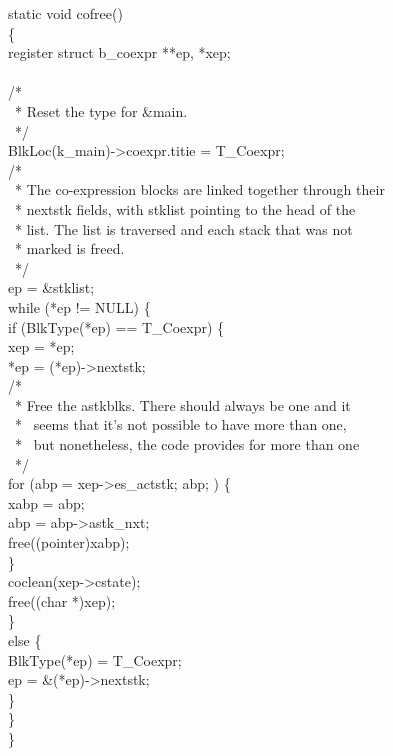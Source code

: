 \bigskip
\begin{iconcode}
static void cofree()\\
\{\\
\>register struct b\_coexpr **ep, *xep;\\
\\
\>/*\\
\>\ * Reset the type for \&main.\\
\>\ */\\
\>BlkLoc(k\_main)->coexpr.titie = T\_Coexpr;\\
\>/*\\
\>\ * The co-expression blocks are linked together through their\\
\>\ * nextstk fields, with stklist pointing to the head of the\\
\>\ * list. The list is traversed and each stack that was not\\
\>\ * marked is freed.\\
\>\ */\\
\>ep = \&stklist;\\
\>while (*ep != NULL) \{\\
\>\>if (BlkType(*ep) == T\_Coexpr) \{\\
\>\>\>xep = *ep;\\
\>\>\>*ep = (*ep)->nextstk;\\
\>\>\>/*\\
\>\>\>\ * Free the astkblks. There should always be one and it\\
\>\>\>\ * \ seems that it's not possible to have more than one,\\
\>\>\>\ * \ but nonetheless, the code provides for more than one\\
\>\>\>\ */\\
\>\>\>for (abp = xep->es\_actstk; abp; ) \{\\
\>\>\>\>xabp = abp;\\
\>\>\>\>abp = abp->astk\_nxt;\\
\>\>\>\>free((pointer)xabp);\\
\>\>\>\>\}\\
\>\>\>coclean(xep->cstate); \\
\>\>\>free((char *)xep);\\
\>\>\>\}\\
\>\>else \{\\
\>\>\>BlkType(*ep) = T\_Coexpr;\\
\>\>\>ep = \&(*ep)->nextstk;\\
\>\>\>\}\\
\>\>\}\\
\}
\end{iconcode}


